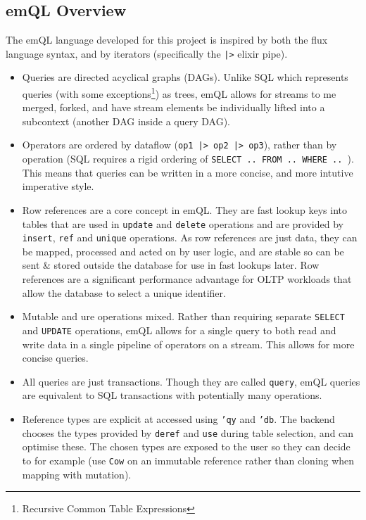 \subsection{emQL Overview}
The emQL language developed for this project is inspired by both the flux language syntax, and by iterators (specifically the \texttt{|>} elixir pipe).
\begin{itemize}
    \setlength\itemsep{0em}
    \item Queries are directed acyclical graphs (DAGs). Unlike SQL which represents queries (with some exceptions\footnote{Recursive Common Table Expressions})
          as trees, emQL allows for streams to me merged, forked, and have stream elements be individually lifted
          into a subcontext (another DAG inside a query DAG).
    \item Operators are ordered by dataflow (\texttt{op1 |> op2 |> op3}), rather than by operation
          (SQL requires a rigid ordering of \texttt{SELECT .. FROM .. WHERE .. }). This means that queries
          can be written in a more concise, and more intutive imperative style.
    \item Row references are a core concept in emQL. They are fast lookup keys into tables that are used in
          \texttt{update} and \texttt{delete} operations and are provided by \texttt{insert},
          \texttt{ref} and \texttt{unique} operations. As row references are just data, they can be mapped,
          processed and acted on by user logic, and are stable so can be sent \& stored outside the database for use in fast
          lookups later. Row references are a significant performance advantage for OLTP workloads that allow the database to
          select a unique identifier.
    \item Mutable and ure operations mixed. Rather than requiring separate \texttt{SELECT} and \texttt{UPDATE}
          operations, emQL allows for a single query to both read and write data in a single pipeline of operators on a stream.
          This allows for more concise queries.
    \item All queries are just transactions. Though they are called \texttt{query}, emQL queries are equivalent to SQL
          transactions with potentially many operations.
    \item Reference types are explicit at accessed using \texttt{'qy} and \texttt{'db}. The backend chooses the types provided by \texttt{deref} and \texttt{use}
          during table selection, and can optimise these. The chosen types are exposed to the user so they can decide to for example (use
          \texttt{Cow} on an immutable reference rather than cloning when mapping with mutation).
\end{itemize}

